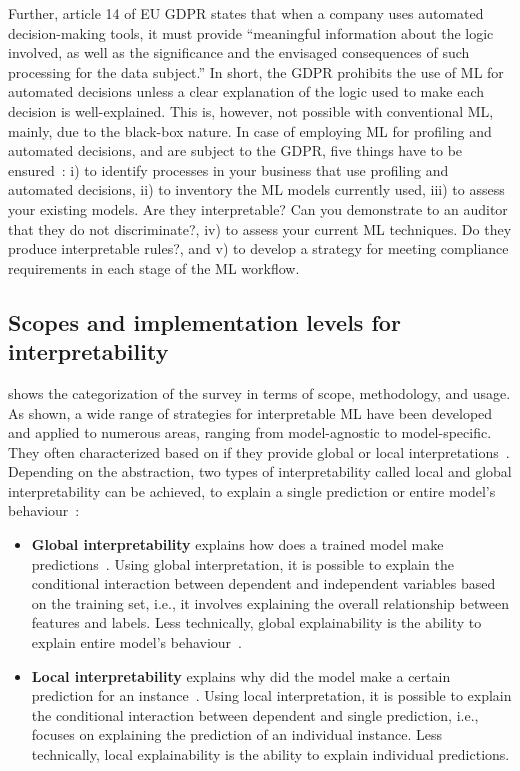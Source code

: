 \hspace*{3.5mm} Further, article 14 of EU GDPR states that when a company uses automated decision-making tools, it must provide ``meaningful information about the logic involved, as well as the significance and the envisaged consequences of such processing for the data subject.” In short, the GDPR prohibits the use of ML for automated decisions unless a clear explanation of the logic used to make each decision is well-explained. This is, however, not possible with conventional ML, mainly, due to the black-box nature. In case of employing ML for profiling and automated decisions, and are subject to the GDPR, five things have to be ensured~\cite{doshi2017towards}: i) to identify processes in your business that use profiling and automated decisions, ii) to inventory the ML models currently used, iii) to assess your existing models. Are they interpretable? Can you demonstrate to an auditor that they do not discriminate?, iv) to assess your current ML techniques. Do they produce interpretable rules?, and v) to develop a strategy for meeting compliance requirements in each stage of the ML workflow.

\subsection{Scopes and implementation levels for interpretability}
 shows the categorization of the survey in terms of scope, methodology, and usage. As shown, a wide range of strategies for interpretable ML have been developed and applied to numerous areas, ranging from model-agnostic to model-specific. They often characterized based on if they provide global or local interpretations~\cite{azodi2020opening}. Depending on the abstraction, two types of interpretability called local and global interpretability can be achieved, to explain a single prediction or entire model's behaviour~\cite{molnar2019interpretable}: 

\begin{itemize}[noitemsep]
    \item \textbf{Global interpretability} explains how does a trained model make predictions~\cite{molnar2019interpretable}. Using global interpretation, it is possible to explain the conditional interaction between dependent and independent variables based on the training set, i.e., it involves explaining the overall relationship between features and labels. Less technically, global explainability is the ability to explain entire model's behaviour~\cite{molnar2019interpretable}. 
    \item \textbf{Local interpretability} explains why did the model make a certain prediction for an instance~\cite{molnar2019interpretable}. Using local interpretation, it is possible to explain the conditional interaction between dependent and single prediction, i.e., focuses on explaining the prediction of an individual instance. Less technically, local explainability is the ability to explain individual predictions.  
\end{itemize}

